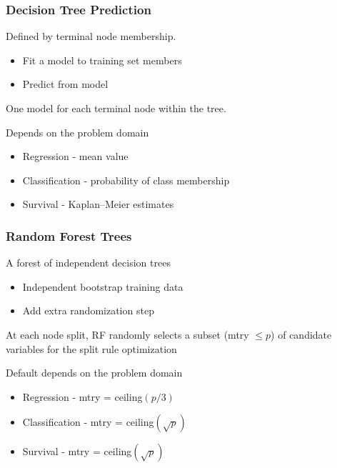 \documentclass[xcolor=svgnames]{beamer}\usepackage[]{graphicx}\usepackage[]{color}
\begin{document}
\begin{frame}
\frametitle{Decision Tree Prediction}

Defined by terminal node membership.
\begin{itemize}
\item Fit a model to training set members
\item Predict from model
\end{itemize}

One model for each terminal node within the tree.

Depends on the problem domain
\begin{itemize}
\item Regression - mean value
\item Classification - probability of class membership
\item Survival - Kaplan--Meier estimates
\end{itemize}

\end{frame}
\begin{frame}
\frametitle{Random Forest Trees}

A forest of independent decision trees

\begin{itemize}
\item Independent bootstrap training data
\item Add extra randomization step
\end{itemize}

At each node split, RF randomly selects a subset (mtry $\le p$) of candidate variables for the split rule optimization

Default depends on the problem domain

\begin{itemize}
\item Regression - mtry = ceiling$(p/3)$
\item Classification - mtry = ceiling$(\sqrt{p})$
\item Survival - mtry = ceiling$(\sqrt{p})$
\end{itemize}

\end{frame}
\end{document}
